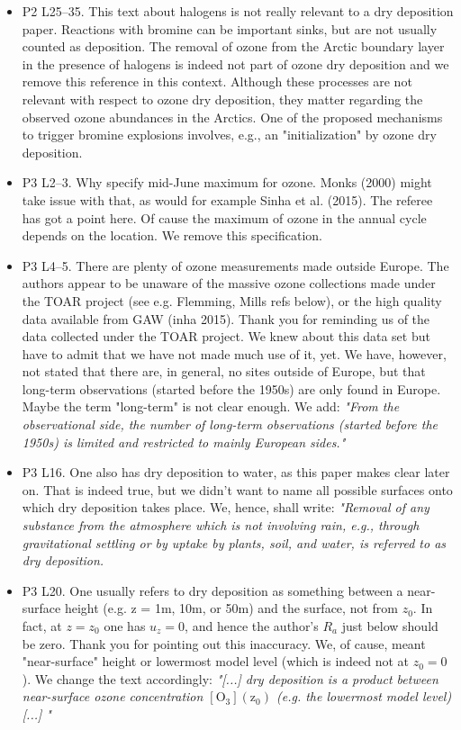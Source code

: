 \begin{itemize}
\item {\color{blue}P2 L25--35. This text about halogens is not really relevant to a dry deposition
paper. Reactions with bromine can be important sinks, but are not usually counted
as deposition.}
  The removal of ozone from the Arctic boundary layer in the presence of halogens is indeed not part of ozone dry deposition and we remove this reference in this context.
Although these processes are not relevant with respect to ozone dry deposition, they matter regarding the observed ozone abundances in the Arctics. One of the proposed mechanisms to trigger bromine explosions involves, e.g., an "initialization" by ozone dry deposition.  
\item {\color{blue}P3 L2--3. Why specify mid-June maximum for ozone. Monks (2000) might
  take issue with that, as would for example Sinha et al. (2015).}
  The referee has got a point here. Of cause the maximum of ozone in the annual cycle depends on the location. We remove this specification.
\item {\color{blue}P3 L4--5. There are plenty of ozone measurements made outside Europe. The
authors appear to be unaware of the massive ozone collections made under the
TOAR project (see e.g. Flemming, Mills refs below), or the high quality data
available from GAW (inha 2015).}
  Thank you for reminding us of the data collected under the TOAR project. We knew about this data set but have to admit that we have not made much use of it, yet. We have, however, not stated that there are, in general, no sites outside of Europe, but that long-term observations (started before the 1950s) are only found in Europe. Maybe the term "long-term" is not clear enough. We add: \emph{"From the observational side, the number of long-term observations (started before the 1950s) is limited and restricted to mainly European sides."}
  
\item {\color{blue}P3 L16. One also has dry deposition to water, as this paper makes clear later on.}
  That is indeed true, but we didn't want to name all possible surfaces onto which dry deposition takes place. We, hence, shall write: \emph{"Removal of any substance from the atmosphere which is not involving rain, e.g., through gravitational settling or by uptake by plants, soil, and water, is referred to as dry deposition.}
  
\item {\color{blue}P3 L20. One usually refers to dry deposition as something between a near-
surface height (e.g. z = 1m, 10m, or 50m) and the surface, not from $z_0$. In fact,
at $z = z_0$ one has $u_z = 0$, and hence the author’s $R_a$ just below should be zero.}
Thank you for pointing out this inaccuracy. We, of cause, meant "near-surface" height or lowermost model level (which is indeed not at $z_0=0$). We change the text accordingly: \emph{"[...] dry deposition is a product between near-surface ozone concentration $\mathrm{[O_3](z_0)}$ (e.g. the lowermost model level) [...] "}
  

\end{itemize}
